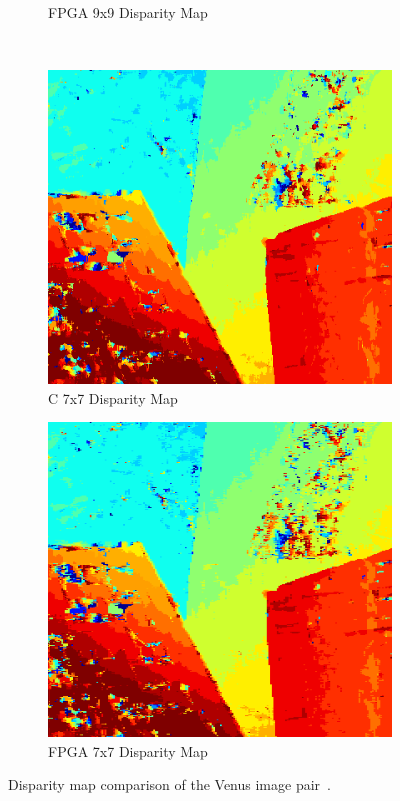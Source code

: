\begin{figure}
\begin{center}
\begin{subfigure}{0.45\textwidth}
		\caption{FPGA 9x9 Disparity Map}
		\label{fig:venusFPGA9x9}
	\end{subfigure}
	\\
	\begin{subfigure}{0.45\textwidth}
		\includegraphics[width=\textwidth]{figures/venus_c_7x7.png}
		\caption{C 7x7 Disparity Map}
		\label{fig:venusC7x7}
	\end{subfigure}
	\begin{subfigure}{0.45\textwidth}
		\includegraphics[width=\textwidth]{figures/venus_buffer_7x7_2.png}
		\caption{FPGA 7x7 Disparity Map}
		\label{fig:venusFPGA7x7}
	\end{subfigure}
	\captionfonts
	\caption{Disparity map comparison of the Venus image pair~\cite{middlebury}.}
	\label{fig:venusDispMap}
\end{center}
\end{figure}


